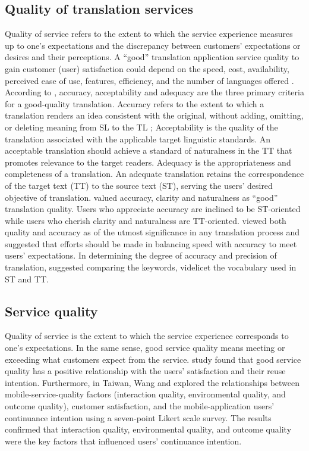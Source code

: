 \documentclass[english]{textolivre}
\begin{document}
\subsection{Quality of translation services}\label{sec-formato}
Quality of service refers to the extent to which the service experience measures up to one’s expectations and the discrepancy between customers’ expectations or desires and their perceptions. A “good” translation application service quality to gain customer (user) satisfaction could depend on the speed, cost, availability, perceived ease of use, features, efficiency, and the number of languages offered \cite{arahita_factors_2015}. According to \textcite{savitri_analysis_2018}, accuracy, acceptability and adequacy are the three primary criteria for a good-quality translation. Accuracy refers to the extent to which a translation renders an idea consistent with the original, without adding, omitting, or deleting meaning from SL to the TL \cite{sharma_relevance_2015}; Acceptability is the quality of the translation associated with the applicable target linguistic standards. An acceptable translation should achieve a standard of naturalness in the TT that promotes relevance to the target readers. Adequacy is the appropriateness and completeness of a translation. An adequate translation retains the correspondence of the target text (TT) to the source text (ST), serving the users’ desired objective of translation. \textcite{nababan_teori_2008} valued accuracy, clarity and naturalness as “good” translation quality. Users who appreciate accuracy are inclined to be ST-oriented while users who cherish clarity and naturalness are TT-oriented. \textcite{taylor_balancing_2017} viewed both quality and accuracy as of the utmost significance in any translation process and suggested that efforts should be made in balancing speed with accuracy to meet users’ expectations. In determining the degree of accuracy and precision of translation, \textcite{farahani_framework_2005} suggested comparing the keywords, videlicet the vocabulary used in ST and TT.

\subsection{Service quality}\label{sec-modelo}
Quality of service is the extent to which the service experience corresponds to one’s expectations. In the same sense, good service quality means meeting or exceeding what customers expect from the service. \textcite{jeon_influence_2016} study found that good service quality has a positive relationship with the users’ satisfaction and their reuse intention. Furthermore, in Taiwan, Wang and \textcite{chen_machine_2017} explored the relationships between mobile-service-quality factors (interaction quality, environmental quality, and outcome quality), customer satisfaction, and the mobile-application users’ continuance intention using a seven-point Likert scale survey. The results confirmed that interaction quality, environmental quality, and outcome quality were the key factors that influenced users’ continuance intention.
\end{document}
